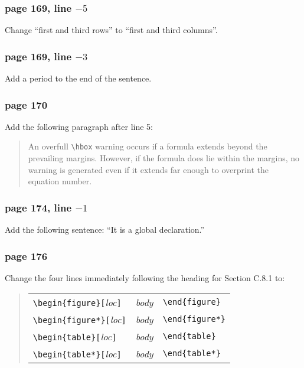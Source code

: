 \subsubsection*{page 169, line $-5$}
Change ``first and third rows'' to ``first and third columns''.

\subsubsection*{page 169, line $-3$}
Add a period to the end of the sentence.

\subsubsection*{page 170}

Add the following paragraph after line 5:
\begin{quote}
An overfull \verb|\hbox| warning occurs if a formula extends beyond the
prevailing margins.  However, if the formula does lie within the
margins, no warning is generated even if it extends far enough to
overprint the equation number.
\end{quote}

\subsubsection*{page 174, line $-1$}
Add the following sentence: ``It is a global declaration.''

\subsubsection*{page 176}

Change the four lines immediately following the heading for
Section C.8.1 to:
\begin{quote}
\begin{tabular}{lll}
 \verb|\begin{figure}[|{\em loc\/}{\tt ]} & {\em body\/}
      & \verb|\end{figure}| \\
 \verb|\begin{figure*}[|{\em loc\/}{\tt ]} & {\em body\/}
      & \verb|\end{figure*}| \\
 \verb|\begin{table}[|{\em loc\/}{\tt ]} & {\em body\/}
      & \verb|\end{table}| \\
 \verb|\begin{table*}[|{\em loc\/}{\tt ]} & {\em body\/}
      & \verb|\end{table*}| 
\end{tabular}
\end{quote}

